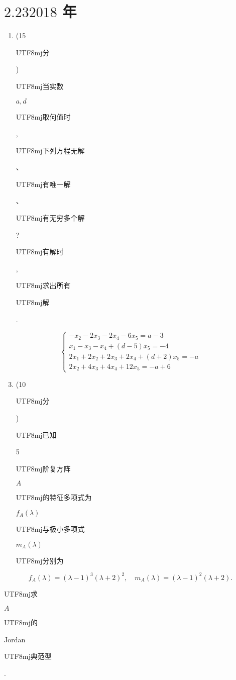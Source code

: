 \documentclass[10pt]{article}
\begin{document}
\section{$2.232018$ 年}
\begin{enumerate}
  \item (15 \begin{CJK}{UTF8}{mj}分\end{CJK}) \begin{CJK}{UTF8}{mj}当实数\end{CJK} $a, d$ \begin{CJK}{UTF8}{mj}取何值时\end{CJK}, \begin{CJK}{UTF8}{mj}下列方程无解\end{CJK}、\begin{CJK}{UTF8}{mj}有唯一解\end{CJK}、\begin{CJK}{UTF8}{mj}有无穷多个解\end{CJK}? \begin{CJK}{UTF8}{mj}有解时\end{CJK}, \begin{CJK}{UTF8}{mj}求出所有\end{CJK} \begin{CJK}{UTF8}{mj}解\end{CJK}.
\end{enumerate}
$$
\left\{\begin{array}{l}
-x_{2}-2 x_{3}-2 x_{4}-6 x_{5}=a-3 \\
x_{1}-x_{3}-x_{4}+(d-5) x_{5}=-4 \\
2 x_{1}+2 x_{2}+2 x_{3}+2 x_{4}+(d+2) x_{5}=-a \\
2 x_{2}+4 x_{3}+4 x_{4}+12 x_{5}=-a+6
\end{array}\right.
$$

\begin{enumerate}
  \setcounter{enumi}{2}
  \item (10 \begin{CJK}{UTF8}{mj}分\end{CJK}) \begin{CJK}{UTF8}{mj}已知\end{CJK} 5 \begin{CJK}{UTF8}{mj}阶复方阵\end{CJK} $A$ \begin{CJK}{UTF8}{mj}的特征多项式为\end{CJK} $f_{A}(\lambda)$ \begin{CJK}{UTF8}{mj}与极小多项式\end{CJK} $m_{A}(\lambda)$ \begin{CJK}{UTF8}{mj}分别为\end{CJK}
\end{enumerate}
$$
f_{A}(\lambda)=(\lambda-1)^{3}(\lambda+2)^{2}, \quad m_{A}(\lambda)=(\lambda-1)^{2}(\lambda+2) .
$$
\begin{CJK}{UTF8}{mj}求\end{CJK} $A$ \begin{CJK}{UTF8}{mj}的\end{CJK} Jordan \begin{CJK}{UTF8}{mj}典范型\end{CJK}.
\end{document}
